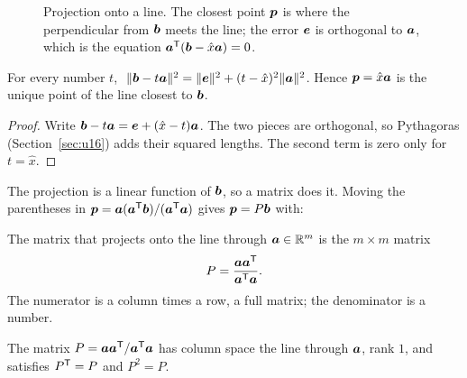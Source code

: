\begin{figure}[ht]
  \centering
  \caption{Projection onto a line. The closest point $\boldsymbol{p}$ is where the perpendicular from
  $\boldsymbol{b}$ meets the line; the error $\boldsymbol{e}$ is orthogonal to $\boldsymbol{a}$, which is the equation
  $\boldsymbol{a}^{\mathsf{T}}(\boldsymbol{b}-\hat{x}\boldsymbol{a})=0$.}
  \label{fig:u17-line}
\end{figure}

\begin{proposition}\label{prop:u17-closest-line}
For every number $t$,
$\ \|\vb{b}-t\vb{a}\|^2=\|\vb{e}\|^2+(t-\hat{x})^2\|\vb{a}\|^2$. Hence $\boldsymbol{p}=\hat{x}\boldsymbol{a}$
is the unique point of the line closest to $\boldsymbol{b}$.
\end{proposition}

\begin{proof}
Write $\boldsymbol{b}-t\boldsymbol{a}=\boldsymbol{e}+(\hat{x}-t)\boldsymbol{a}$. The two pieces are orthogonal, so
Pythagoras (Section~\ref{sec:u16}) adds their squared lengths. The second term is zero only for $t=\hat{x}$.
\end{proof}

The projection is a linear function of $\boldsymbol{b}$, so a matrix does it. Moving the parentheses
in $\boldsymbol{p}=\boldsymbol{a}(\boldsymbol{a}^{\mathsf{T}}\boldsymbol{b})/(\boldsymbol{a}^{\mathsf{T}}\boldsymbol{a})$ gives $\boldsymbol{p}=P\boldsymbol{b}$ with:

\begin{definition}\label{def:u17-pline}
The matrix that projects onto the line through $\boldsymbol{a}\in\mathbb{R}^m$ is the $m\times m$ matrix
\[
  P=\frac{\boldsymbol{a}\boldsymbol{a}^{\mathsf{T}}}{\boldsymbol{a}^{\mathsf{T}}\boldsymbol{a}} .
\]
The numerator is a column times a row, a full matrix; the denominator is a number.
\end{definition}

\begin{proposition}\label{prop:u17-pline-props}
The matrix $P=\boldsymbol{a}\boldsymbol{a}^{\mathsf{T}}/\boldsymbol{a}^{\mathsf{T}}\boldsymbol{a}$ has column space the line through $\boldsymbol{a}$, rank
$1$, and satisfies $P^{\mathsf{T}}=P$ and $P^2=P$.
\end{proposition}

